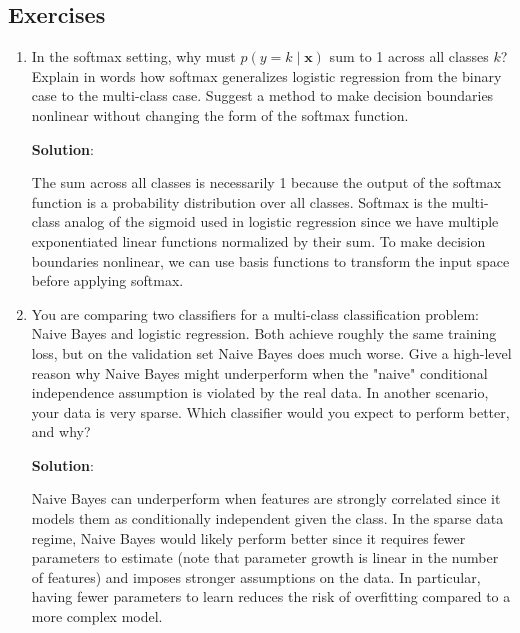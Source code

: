 \documentclass[11pt, letterpaper]{article}
\theoremstyle{definition}
\theoremstyle{plain}
\newenvironment{solution}{
    \vspace{2mm}
    \color{blue}\noindent\textbf{Solution}:
}{}
\begin{document}
\subsection{Exercises}
\begin{mdframed}
    \begin{enumerate}
        \item In the softmax setting, why must $p(y=k\mid \mathbf{x})$ sum to 1 across all classes $k$? Explain in words how softmax generalizes logistic regression from the binary case to the multi-class case. Suggest a method to make decision boundaries nonlinear without changing the form of the softmax function.
        
        \begin{solution}
            The sum across all classes is necessarily 1 because the output of the softmax function is a probability distribution over all classes. Softmax is the multi-class analog of the sigmoid used in logistic regression since we have multiple exponentiated linear functions normalized by their sum. To make decision boundaries nonlinear, we can use basis functions to transform the input space before applying softmax.
        \end{solution}

        \item You are comparing two classifiers for a multi-class classification problem: Naive Bayes and logistic regression. Both achieve roughly the same training loss, but on the validation set Naive Bayes does much worse. Give a high-level reason why Naive Bayes might underperform when the "naive" conditional independence assumption is violated by the real data. In another scenario, your data is very sparse. Which classifier would you expect to perform better, and why?
        
        \begin{solution}
            Naive Bayes can underperform when features are strongly correlated since it models them as conditionally independent given the class. In the sparse data regime, Naive Bayes would likely perform better since it requires fewer parameters to estimate (note that parameter growth is linear in the number of features) and imposes stronger assumptions on the data. In particular, having fewer parameters to learn reduces the risk of overfitting compared to a more complex model.
        \end{solution}
    \end{enumerate}
\end{mdframed}
\end{document}
